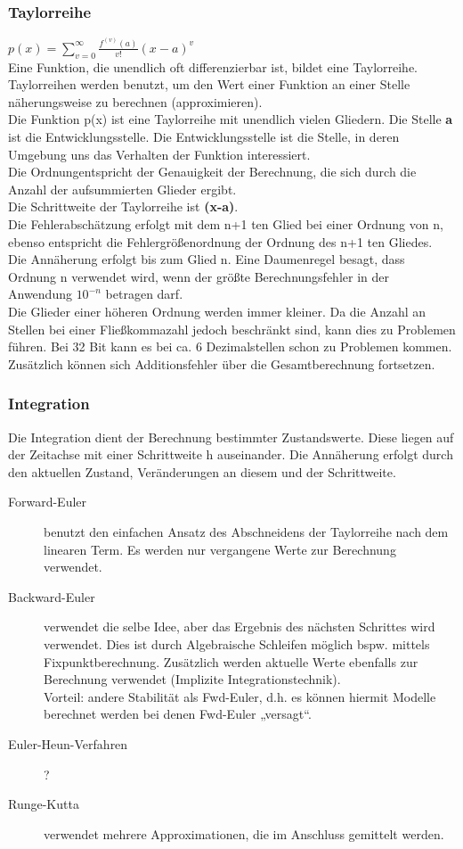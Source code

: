 \documentclass[11pt, fleqn, a4paper, leqno]{scrartcl} %
\begin{document}
			\subsubsection{Taylorreihe}
				$p(x) = \sum\limits_{v=0}^{\infty}\frac{f^{(v)}(a)}{v!}(x-a)^v$\\
				Eine Funktion, die unendlich oft differenzierbar ist, bildet eine Taylorreihe. Taylorreihen werden benutzt, um den Wert einer Funktion an einer Stelle näherungsweise zu berechnen (approximieren).\\
				Die Funktion p(x) ist eine Taylorreihe mit unendlich vielen Gliedern. Die Stelle \textbf{a} ist die Entwicklungsstelle. Die Entwicklungsstelle ist die Stelle, in deren Umgebung uns das Verhalten der Funktion interessiert.\\
				Die \glqq Ordnung\grqq entspricht der Genauigkeit der Berechnung, die sich durch die Anzahl der aufsummierten Glieder ergibt.\\
				Die Schrittweite der Taylorreihe ist \textbf{(x-a)}.\\
				Die Fehlerabschätzung erfolgt mit dem n+1 ten Glied bei einer Ordnung von n, ebenso entspricht die Fehlergrößenordnung der Ordnung des n+1 ten Gliedes.\\
				Die Annäherung erfolgt bis zum Glied n. Eine Daumenregel besagt, dass Ordnung n verwendet wird, wenn der größte Berechnungsfehler in der Anwendung $10^{-n}$ betragen darf.\\
				Die Glieder einer höheren Ordnung werden immer kleiner. Da die Anzahl an Stellen bei einer Fließkommazahl jedoch beschränkt sind, kann dies zu Problemen führen. Bei 32 Bit kann es bei ca. 6 Dezimalstellen schon zu Problemen kommen. Zusätzlich können sich Additionsfehler über die Gesamtberechnung fortsetzen.
			\subsubsection{Integration}
				Die Integration dient der Berechnung bestimmter Zustandswerte. Diese liegen auf der Zeitachse mit einer Schrittweite h auseinander. Die Annäherung erfolgt durch den aktuellen Zustand, Veränderungen an diesem und der Schrittweite.
				\begin{description}
					\item[Forward-Euler] benutzt den einfachen Ansatz des Abschneidens der Taylorreihe nach dem linearen Term. Es werden nur vergangene Werte zur Berechnung verwendet.
					\item[Backward-Euler] verwendet die selbe Idee, aber das Ergebnis des nächsten Schrittes wird verwendet. Dies ist durch Algebraische Schleifen möglich bspw. mittels Fixpunktberechnung. Zusätzlich werden aktuelle Werte ebenfalls zur Berechnung verwendet (Implizite Integrationstechnik).\\
					Vorteil: andere Stabilität als Fwd-Euler, d.h. es können hiermit Modelle berechnet werden bei denen Fwd-Euler „versagt“.
					\item[Euler-Heun-Verfahren] ?
					\item[Runge-Kutta] verwendet mehrere Approximationen, die im Anschluss gemittelt werden.
				\end{description}
\end{document}
